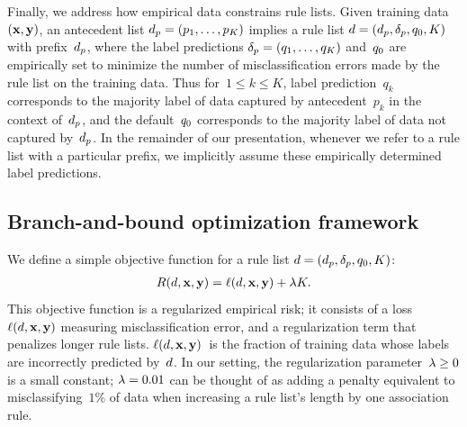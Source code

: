 Finally, we address how empirical data constrains rule lists.
%
Given training data~${(\mathbf{x}, \mathbf{y})}$,
an antecedent list ${d_p = (p_1, \dots, p_K)}$
implies a rule list ${{d} = (d_p, \delta_p, q_0, K)}$
with prefix~$d_p$, where the label predictions
${\delta_p = (q_1, \dots, q_K)}$ and~$q_0$ are empirically set
to minimize the number of misclassification errors made by
the rule list on the training data.
%
Thus for~${1 \le k \le K}$, label prediction~$q_k$ corresponds to the
majority label of data captured by antecedent~$p_k$ in the context of~$d_p$,
and the default~$q_0$ corresponds to the majority label of data
not captured by~$d_p$.
%
In the remainder of our presentation, whenever we refer to a rule list with a
particular prefix, we implicitly assume these empirically determined label predictions.

\subsection{Branch-and-bound optimization framework}

We define a simple objective function for a rule list ${{d} = (d_p, \delta_p, q_0, K)}$:
\begin{align}
\Obj(\RL, \x, \y) = \Loss(\RL, \x, \y) + \Reg K.
\label{eq:objective}
\end{align}
This objective function is a regularized empirical risk;
it consists of a loss~$\ell({d}, \mathbf{x}, \mathbf{y})$ measuring misclassification error,
and a regularization term that penalizes longer rule lists.
%
$\ell({d}, \mathbf{x}, \mathbf{y})$~is the fraction of training data whose labels are
incorrectly predicted by~${d}$.
%
In our setting, the regularization parameter~${{\lambda} \ge 0}$ is a small constant;
\eg ${{\lambda} = 0.01}$ can be thought of as adding a penalty equivalent to misclassifying~$1\%$
of data when increasing a rule list's length by one association rule.
%


